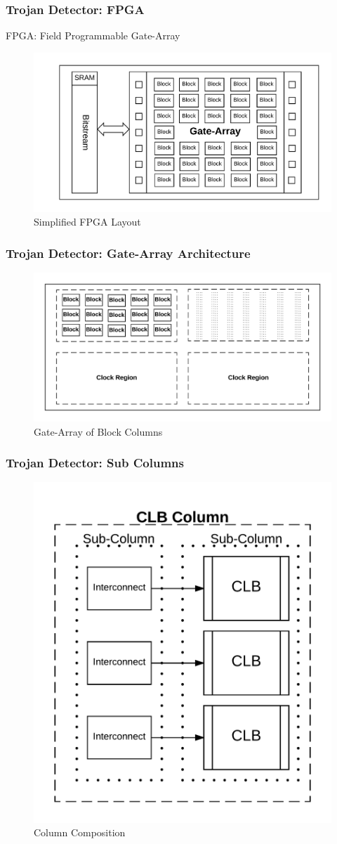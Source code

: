 \documentclass{beamer}
\begin{document}
\begin{frame}
	\frametitle{Trojan Detector: FPGA}
	FPGA: Field Programmable Gate-Array
	\begin{figure}
		\centering
		\includegraphics[width=0.7\linewidth]{../Thesis/Figures/architecture}
		\caption[Simplified FPGA Layout]{Simplified FPGA Layout}
		\label{fig:architecture}
	\end{figure}
\end{frame}

\begin{frame}
	\frametitle{Trojan Detector: Gate-Array Architecture}
	\begin{figure}
		\centering
		\includegraphics[width=0.7\linewidth]{../Thesis/Figures/FPGA}
		\caption[Gate-Array of Block Columns]{Gate-Array of Block Columns}
		\label{fig:FPGA}
	\end{figure}
\end{frame}

\begin{frame}
	\frametitle{Trojan Detector: Sub Columns}
	\begin{figure}
		\centering
		\includegraphics[width=0.5\linewidth]{../Thesis/Figures/column}
		\caption[Column Composition]{Column Composition}
		\label{fig:column}
	\end{figure}
\end{frame}
\end{document}
